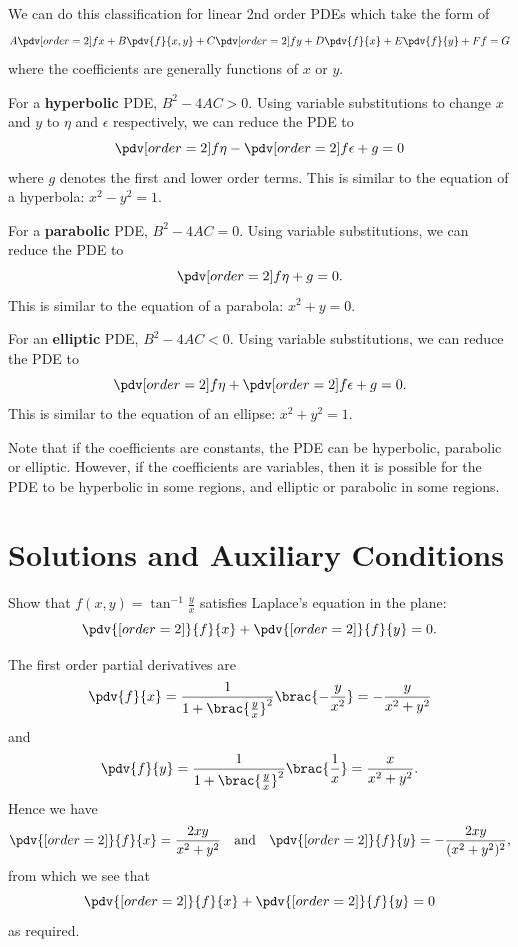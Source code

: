 \begin{itemize}
We can do this classification for linear 2nd order PDEs which take the form of 
\[ A\pdv[order={2}]{f}{x} + B\pdv{f}{x,y} + C\pdv[order={2}]{f}{y} + D\pdv{f}{x} + E\pdv{f}{y} + Ff = G \]
where the coefficients are generally functions of $x$ or $y$.

For a \textbf{hyperbolic} PDE, $B^2-4AC>0$. Using variable substitutions to change $x$ and $y$ to $\eta$ and $\epsilon$ respectively, we can reduce the PDE to \[ \pdv[order={2}]{f}{\eta} - \pdv[order={2}]{f}{\epsilon} + g = 0 \] where $g$ denotes the first and lower order terms. This is similar to the equation of a hyperbola: $x^2-y^2=1$.

For a \textbf{parabolic} PDE, $B^2-4AC=0$. Using variable substitutions, we can reduce the PDE to \[ \pdv[order={2}]{f}{\eta} + g = 0. \] This is similar to the equation of a parabola: $x^2+y=0$.

For an \textbf{elliptic} PDE, $B^2-4AC<0$. Using variable substitutions, we can reduce the PDE to \[ \pdv[order={2}]{f}{\eta} + \pdv[order={2}]{f}{\epsilon} + g = 0. \] This is similar to the equation of an ellipse: $x^2+y^2=1$.

Note that if the coefficients are constants, the PDE can be hyperbolic, parabolic or elliptic. However, if the coefficients are variables, then it is possible for the PDE to be hyperbolic in some regions, and elliptic or parabolic in some regions.
\end{itemize}

\section{Solutions and Auxiliary Conditions}
\begin{exercise}{}{}
Show that $f(x,y)=\tan^{-1}\frac{y}{x}$ satisfies Laplace's equation in the plane:
\[ \pdv{[order={2}]}{f}{x}+\pdv{[order={2}]}{f}{y}=0. \]
\end{exercise}

\begin{solution}
The first order partial derivatives are
\[ \pdv{f}{x}=\frac{1}{1+\brac{\frac{y}{x}}^2}\brac{-\frac{y}{x^2}}=-\frac{y}{x^2+y^2} \]
and
\[ \pdv{f}{y}=\frac{1}{1+\brac{\frac{y}{x}}^2}\brac{\frac{1}{x}}=\frac{x}{x^2+y^2}. \]
Hence we have
\[ \pdv{[order={2}]}{f}{x}=\frac{2xy}{x^2+y^2} \quad \text{and} \quad \pdv{[order={2}]}{f}{y}=-\frac{2xy}{(x^2+y^2)^2}, \]
from which we see that
\[ \pdv{[order={2}]}{f}{x}+\pdv{[order={2}]}{f}{y}=0 \]
as required.
\end{solution}

